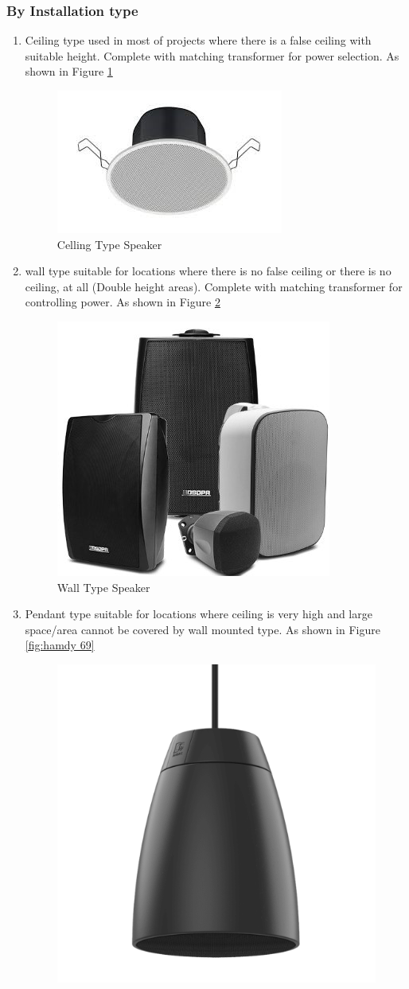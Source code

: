 \documentclass[12pt,fleqn]{book} %
\begin{document}
\subsubsection{By Installation type}
\begin{enumerate}
    \item Ceiling type used in most of projects where there is a false ceiling with suitable height. Complete with matching transformer for power selection. As shown in Figure \ref{fig:hamdy 67}
    \begin{figure}[!h]
    \centering
    \includegraphics[width=0.5\linewidth]{hamdy 67.png}
    \caption{Celling Type Speaker}
    \label{fig:hamdy 67}
    \end{figure}
    \item wall type suitable for locations where there is no false ceiling or there is no ceiling, at all (Double height areas). Complete with matching transformer for controlling power. As shown in Figure \ref{fig:hamdy 68}
     \begin{figure}[!h]
    \centering
    \includegraphics[width=0.5\linewidth]{hamdy 68.png}
    \caption{Wall Type Speaker}
    \label{fig:hamdy 68}
    \end{figure}
    \item Pendant type suitable for locations where ceiling is very high and large space/area cannot be covered by wall mounted type. As shown in Figure \ref{fig:hamdy 69}
       \begin{figure}[!h]
    \centering
    \includegraphics[width=0.5\linewidth]{hamdy 69.png}

\end{figure}
\end{enumerate}
\end{document}

